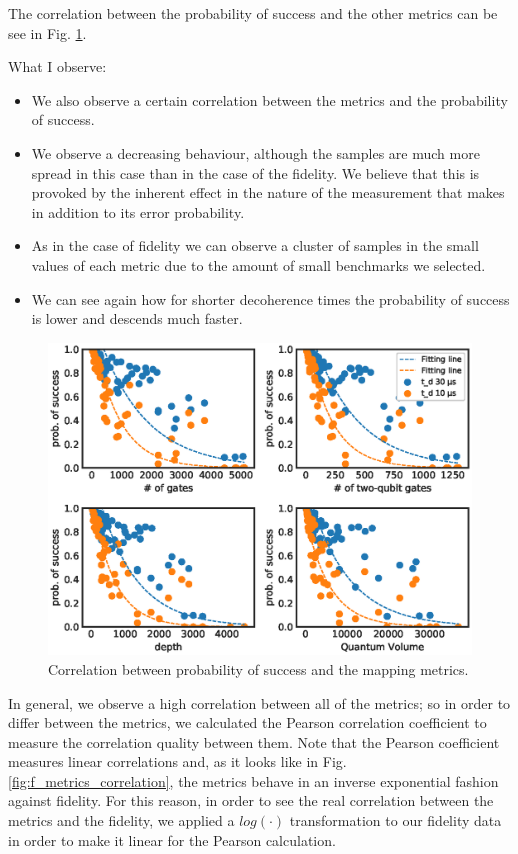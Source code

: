 The correlation between the probability of success and the other metrics can be see in Fig. \ref{fig:ps_metrics_correlation}.

What I observe:

\begin{itemize}
\item We also observe a certain correlation between the metrics and the probability of success.
\item We observe a decreasing behaviour, although the samples are much more spread in this case than in the case of the fidelity. We believe that this is provoked by the inherent effect in the nature of the measurement that makes in addition to its error probability.
\item As in the case of fidelity we can observe a cluster of samples in the small values of each metric due to the amount of small benchmarks we selected.
\item We can see again how for shorter decoherence times the probability of success is lower and descends much faster.
\end{itemize}


\begin{figure}[htbp]
\centering
\includegraphics[width=\textwidth]{figures/ps_metrics_correlation.eps}
\caption{\label{fig:ps_metrics_correlation}
Correlation between probability of success and the mapping metrics.}
\end{figure}

In general, we observe a high correlation between all of the metrics; so in order to differ between the metrics, we calculated the Pearson correlation coefficient to measure the correlation quality between them.
Note that the Pearson coefficient measures linear correlations and, as it looks like in Fig. \ref{fig:f_metrics_correlation}, the metrics behave in an inverse exponential fashion against fidelity.
For this reason, in order to see the real correlation between the metrics and the fidelity, we applied a \(log(·)\) transformation to our fidelity data in order to make it linear for the Pearson calculation.


